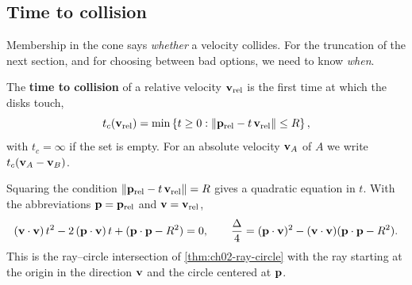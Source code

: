 \subsection{Time to collision}
\label{sec:ch12-ttc}

Membership in the cone says \emph{whether} a velocity collides. For the
truncation of the next section, and for choosing between bad options, we need
to know \emph{when}.

\begin{definition}
\label{def:ch12-ttc}
The \textbf{time to collision} of a relative
velocity $\mathbf{v}_{\mathrm{rel}}$ is the first time at which the disks touch,
\begin{equation}
  t_c(\mathbf{v}_{\mathrm{rel}}) = \min\left\{ t \ge 0 :
    \left\lVert \mathbf{p}_{\mathrm{rel}} - t\,\mathbf{v}_{\mathrm{rel}} \right\rVert \le R \right\},
  \label{eq:ch12-ttc-def}
\end{equation}
with $t_c = \infty$ if the set is empty. For an absolute velocity $\mathbf{v}_A$ of
$A$ we write $t_c(\mathbf{v}_A - \mathbf{v}_B)$.
\end{definition}

Squaring the condition $\left\lVert \mathbf{p}_{\mathrm{rel}} - t\,\mathbf{v}_{\mathrm{rel}} \right\rVert = R$
gives a quadratic equation in $t$. With the abbreviations $\mathbf{p} = \mathbf{p}_{\mathrm{rel}}$ and $\mathbf{v} = \mathbf{v}_{\mathrm{rel}}$,
\begin{equation}
  (\mathbf{v}\cdot\mathbf{v})\,t^2 - 2\,(\mathbf{p}\cdot\mathbf{v})\,t + (\mathbf{p}\cdot\mathbf{p} - R^2) = 0,
  \qquad
  \frac{\Delta}{4} = (\mathbf{p}\cdot\mathbf{v})^2 - (\mathbf{v}\cdot\mathbf{v})(\mathbf{p}\cdot\mathbf{p} - R^2).
  \label{eq:ch12-quadratic}
\end{equation}
This is the ray--circle intersection of \cref{thm:ch02-ray-circle} with the ray starting at
the origin in the direction $\mathbf{v}$ and the circle centered at $\mathbf{p}$.

